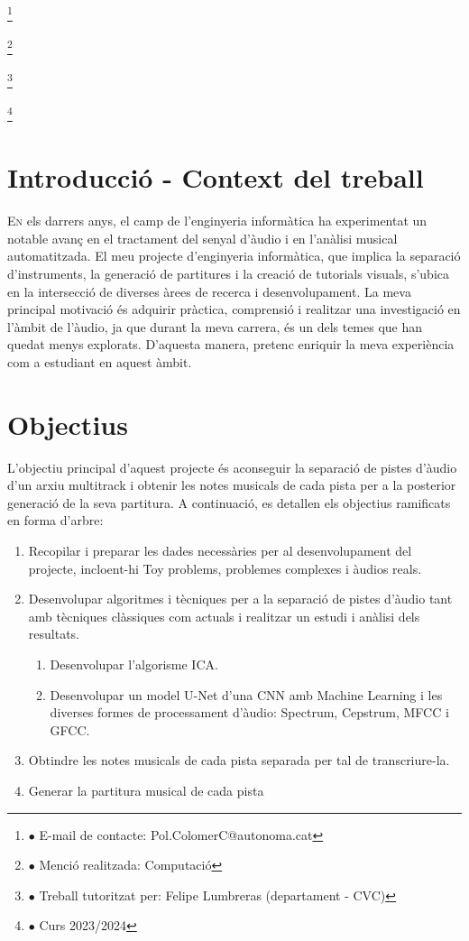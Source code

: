 \documentclass[10pt,a4paper,twocolumn,twoside]{article}
\newcommand\blfootnote[1]{%
  \begingroup
  \renewcommand\thefootnote{}\footnote{#1}%
  \addtocounter{footnote}{-1}%
  \endgroup
}
\begin{document}
\blfootnote{$\bullet$ E-mail de contacte: Pol.ColomerC@autonoma.cat}
\blfootnote{$\bullet$ Menció realitzada: Computació}
\blfootnote{$\bullet$ Treball tutoritzat per: Felipe Lumbreras (departament - CVC)}
\blfootnote{$\bullet$ Curs 2023/2024}


\section{Introducció - Context del treball}
\label{sec:intro}

\lettrine[lines=3]{E}{n} els darrers anys, el camp de l'enginyeria informàtica ha experimentat un notable avanç en el tractament del senyal d'àudio i en l'anàlisi musical automatitzada. El meu projecte d'enginyeria informàtica, que implica la separació d'instruments, la generació de partitures i la creació de tutorials visuals, s'ubica en la intersecció de diverses àrees de recerca i desenvolupament. La meva principal motivació és adquirir pràctica, comprensió i realitzar una investigació en l'àmbit de l'àudio, ja que durant la meva carrera, és un dels temes que han quedat menys explorats. D'aquesta manera, pretenc enriquir la meva experiència com a estudiant en aquest àmbit.


\section{Objectius}
\label{sec:objectius}

L'objectiu principal d'aquest projecte és aconseguir la separació de pistes d'àudio d'un arxiu multitrack i obtenir les notes musicals de cada pista per a la posterior generació de la seva partitura. A continuació, es detallen els objectius ramificats en forma d'arbre:

\begin{enumerate}
    \item Recopilar i preparar les dades necessàries per al desenvolupament del projecte, incloent-hi Toy problems, problemes complexes i àudios reals.
    
    \item Desenvolupar algoritmes i tècniques per a la separació de pistes d'àudio tant amb tècniques clàssiques com actuals i realitzar un estudi i anàlisi dels resultats.
    \begin{enumerate}
        \item Desenvolupar l'algorisme ICA.
        \item Desenvolupar un model U-Net d'una CNN amb Machine Learning i les diverses formes de processament d'àudio: Spectrum, Cepstrum, MFCC i GFCC.
    \end{enumerate}
    \item Obtindre les notes musicals de cada pista separada per tal de transcriure-la.
    \item Generar la partitura musical de cada pista
\end{enumerate}
\end{document}
